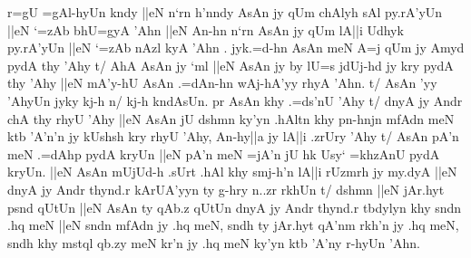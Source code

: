 \documentclass[a4paper,11pt]{article}
\begin{document}
r=gU =gAl-hyUn kndy ||eN n`rn h'nndy AsAn jy qUm chAlyh sAl py.rA'yUn
||eN `=zAb bhU=gyA 'Ahn ||eN An-hn n`rn AsAn jy qUm lA||i Udhyk
py.rA'yUn ||eN `=zAb nAzl kyA 'Ahn . jyk.=d-hn AsAn meN A=j qUm jy
Amyd pydA thy 'Ahy t/ AhA AsAn jy `ml ||eN AsAn jy by lU=s jdUj-hd jy
kry pydA thy 'Ahy ||eN mA'y-hU AsAn .=dAn-hn wAj-hA'yy rhyA 'Ahn. t/
AsAn 'yy 'AhyUn jyky kj-h n/ kj-h kndAsUn. pr AsAn khy .=ds'nU 'Ahy t/
dnyA jy Andr chA thy rhyU {}'Ahy ||eN AsAn jU dshmn ky'yn .hAltn khy
pn-hnjn mfAdn meN ktb 'A'n'n jy kUshsh kry rhyU 'Ahy, An-hy||a jy
lA||i .zrUry 'Ahy t/ AsAn pA'n meN .=dAhp pydA kryUn ||eN pA'n meN
=jA'n jU hk Usy` =khzAnU pydA kryUn. ||eN AsAn mUjUd-h .sUrt .hAl khy
smj-h'n lA||i rUzmrh jy my.dyA ||eN dnyA jy Andr thynd.r kArUA'yyn ty
g-hry n..zr rkhUn t/ dshmn ||eN jAr.hyt psnd qUtUn ||eN AsAn ty qAb.z
qUtUn dnyA jy Andr thynd.r tbdylyn khy sndn .hq meN ||eN sndn mfAdn jy
.hq meN, sndh ty jAr.hyt qA'nm rkh'n jy .hq meN, sndh khy mstql qb.zy
meN kr'n jy .hq meN ky'yn ktb 'A'ny r-hyUn 'Ahn.


\popocplist
\end{document}
